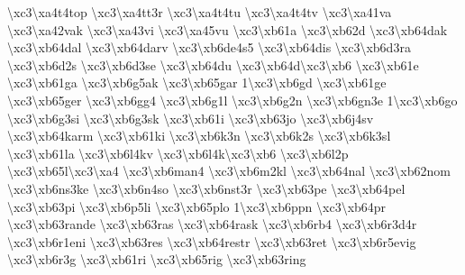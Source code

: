 {\textbackslash{}xc3\textbackslash{}xa4t4top \textbackslash{}xc3\textbackslash{}xa4tt3r \textbackslash{}xc3\textbackslash{}xa4t4tu \textbackslash{}xc3\textbackslash{}xa4t4tv \textbackslash{}xc3\textbackslash{}xa41va \textbackslash{}xc3\textbackslash{}xa42vak \textbackslash{}xc3\textbackslash{}xa43vi \textbackslash{}xc3\textbackslash{}xa45vu \textbackslash{}xc3\textbackslash{}xb61a \textbackslash{}xc3\textbackslash{}xb62d \textbackslash{}xc3\textbackslash{}xb64dak \textbackslash{}xc3\textbackslash{}xb64dal \textbackslash{}xc3\textbackslash{}xb64darv \textbackslash{}xc3\textbackslash{}xb6de4s5 \textbackslash{}xc3\textbackslash{}xb64dis \textbackslash{}xc3\textbackslash{}xb6d3ra \textbackslash{}xc3\textbackslash{}xb6d2s \textbackslash{}xc3\textbackslash{}xb6d3se \textbackslash{}xc3\textbackslash{}xb64du \textbackslash{}xc3\textbackslash{}xb64d\textbackslash{}xc3\textbackslash{}xb6 \textbackslash{}xc3\textbackslash{}xb61e \textbackslash{}xc3\textbackslash{}xb61ga \textbackslash{}xc3\textbackslash{}xb6g5ak \textbackslash{}xc3\textbackslash{}xb65gar 1\textbackslash{}xc3\textbackslash{}xb6gd \textbackslash{}xc3\textbackslash{}xb61ge \textbackslash{}xc3\textbackslash{}xb65ger \textbackslash{}xc3\textbackslash{}xb6gg4 \textbackslash{}xc3\textbackslash{}xb6g1l \textbackslash{}xc3\textbackslash{}xb6g2n \textbackslash{}xc3\textbackslash{}xb6gn3e 1\textbackslash{}xc3\textbackslash{}xb6go \textbackslash{}xc3\textbackslash{}xb6g3si \textbackslash{}xc3\textbackslash{}xb6g3sk \textbackslash{}xc3\textbackslash{}xb61i \textbackslash{}xc3\textbackslash{}xb63jo \textbackslash{}xc3\textbackslash{}xb6j4sv \textbackslash{}xc3\textbackslash{}xb64karm \textbackslash{}xc3\textbackslash{}xb61ki \textbackslash{}xc3\textbackslash{}xb6k3n \textbackslash{}xc3\textbackslash{}xb6k2s \textbackslash{}xc3\textbackslash{}xb6k3sl \textbackslash{}xc3\textbackslash{}xb61la \textbackslash{}xc3\textbackslash{}xb6l4kv \textbackslash{}xc3\textbackslash{}xb6l4k\textbackslash{}xc3\textbackslash{}xb6 \textbackslash{}xc3\textbackslash{}xb6l2p \textbackslash{}xc3\textbackslash{}xb65l\textbackslash{}xc3\textbackslash{}xa4 \textbackslash{}xc3\textbackslash{}xb6man4 \textbackslash{}xc3\textbackslash{}xb6m2kl \textbackslash{}xc3\textbackslash{}xb64nal \textbackslash{}xc3\textbackslash{}xb62nom \textbackslash{}xc3\textbackslash{}xb6ns3ke \textbackslash{}xc3\textbackslash{}xb6n4so \textbackslash{}xc3\textbackslash{}xb6nst3r \textbackslash{}xc3\textbackslash{}xb63pe \textbackslash{}xc3\textbackslash{}xb64pel \textbackslash{}xc3\textbackslash{}xb63pi \textbackslash{}xc3\textbackslash{}xb6p5li \textbackslash{}xc3\textbackslash{}xb65plo 1\textbackslash{}xc3\textbackslash{}xb6ppn \textbackslash{}xc3\textbackslash{}xb64pr \textbackslash{}xc3\textbackslash{}xb63rande \textbackslash{}xc3\textbackslash{}xb63ras \textbackslash{}xc3\textbackslash{}xb64rask \textbackslash{}xc3\textbackslash{}xb6rb4 \textbackslash{}xc3\textbackslash{}xb6r3d4r \textbackslash{}xc3\textbackslash{}xb6r1eni \textbackslash{}xc3\textbackslash{}xb63res \textbackslash{}xc3\textbackslash{}xb64restr \textbackslash{}xc3\textbackslash{}xb63ret \textbackslash{}xc3\textbackslash{}xb6r5evig \textbackslash{}xc3\textbackslash{}xb6r3g \textbackslash{}xc3\textbackslash{}xb61ri \textbackslash{}xc3\textbackslash{}xb65rig \textbackslash{}xc3\textbackslash{}xb63ring }
